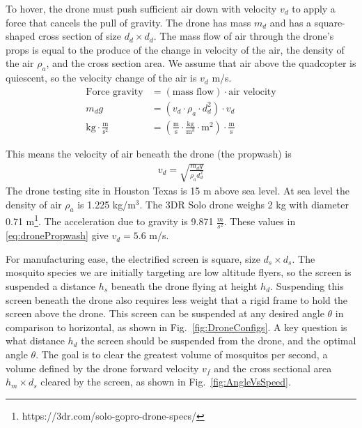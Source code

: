 \documentclass[letterpaper, 10 pt, conference]{ieeeconf}  %
\begin{document}
 To hover, the drone must push sufficient air down with velocity $v_d$ to apply a force that cancels the pull of gravity. 
 The drone has mass $m_{d}$ and has a square-shaped cross section of size $d_d \times d_d$.  The mass flow of air through the drone's props is equal to the produce of the change in velocity of the air, the density of the air $\rho_a$, and the cross section area.
We assume that air above the quadcopter is quiescent, so the velocity change of the air is $v_d$ m/s.
 \begin{align} \label{eq:forceBalanceForDrone}
 \text{Force gravity} & = \left(\text{mass flow}\right) \cdot \text{air velocity} \nonumber \\
m_{d} g &= (v_d \cdot  \rho_a \cdot  d_d^2 ) \cdot  v_d \\
 \text{kg} \cdot \frac{ \text{m}}{ \text{s}^2}&= \left( \frac{ \text{m}}{\text{s}} \cdot  \frac{ \text{kg}}{\text{m}^3}  \cdot \text{m}^2 \right) \cdot  \frac{ \text{m}}{\text{s}}\nonumber
\end{align}

This means the velocity of air beneath the drone (the propwash) is
 \begin{align} \label{eq:dronePropwash}
v_d = \sqrt{ \frac{ m_d g}{\rho_a d_d^2} }
\end{align}
The drone testing site in Houston Texas is 15 m above sea level. At sea level the density of air $\rho_a$ is 1.225 kg/m$^3$.
The 3DR Solo drone weighs 2 kg with diameter 0.71 m\footnote{https://3dr.com/solo-gopro-drone-specs/}. The acceleration due to gravity is 9.871 $\frac{m}{s^2}$.  These values in \eqref{eq:dronePropwash} give $v_d = 5.6$ m/s.

For manufacturing ease, the electrified screen is square, size $d_s \times d_s$. The mosquito species we are initially targeting are low altitude flyers, so the screen is suspended a distance $h_s$ beneath the drone flying at height $h_d$.
Suspending this screen beneath the drone also requires less weight that a rigid frame to hold the screen above the drone.  This screen can be suspended at any desired angle $\theta$ in comparison to horizontal, as shown in Fig.~\ref{fig:DroneConfigs}.
A key question is what distance $h_d$ the screen should be suspended from the drone, and the optimal angle $\theta$.  The goal is to clear the greatest volume of mosquitos per second, a volume defined by the drone forward velocity $v_f$ and the cross sectional area $h_m \times d_s$ cleared by the screen, as shown in Fig.~\ref{fig:AngleVsSpeed}.
\end{document}
